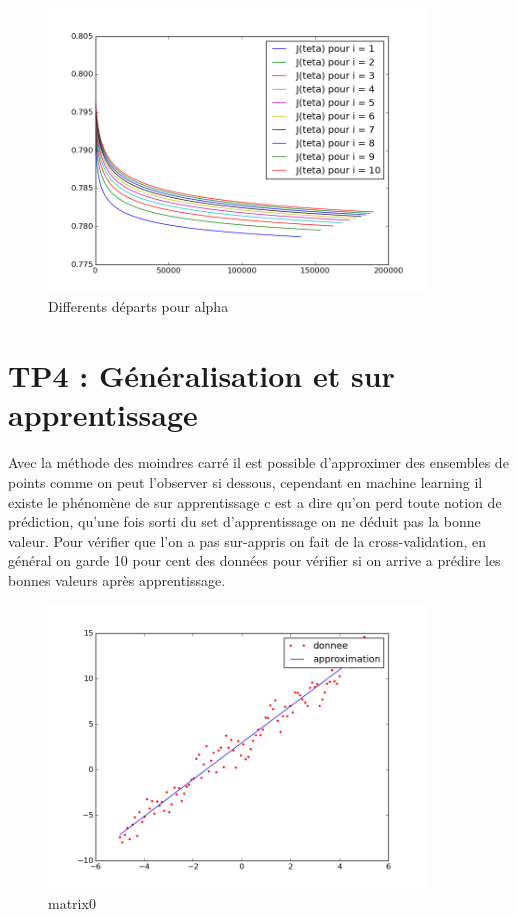 \documentclass[a4paper,10pt]{report}
\begin{document}
\begin{figure}[H]
 \centering
 \caption{Differents départs pour alpha}
 \includegraphics[width=10cm]{tp3.png}
\end{figure}

\section{TP4 : Généralisation et sur apprentissage}
Avec la méthode des moindres carré il est possible d'approximer des ensembles de points comme on peut l'observer si dessous,
cependant en machine learning il existe le phénomène de sur apprentissage c est a dire qu'on perd toute notion de prédiction,
qu'une fois sorti du set d'apprentissage on ne déduit pas la bonne valeur. Pour vérifier que l'on a pas sur-appris
on fait de la cross-validation, en général on garde 10 pour cent des données pour vérifier si on arrive a prédire les bonnes 
valeurs après apprentissage.

\begin{figure}[H]
 \centering
 \caption{matrix0}
 \includegraphics[width=10cm]{matrix0.png}
\end{figure}
\end{document}
